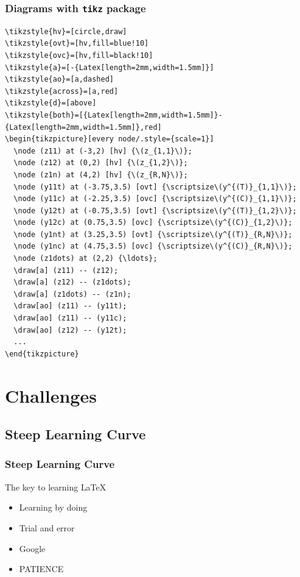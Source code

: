 \documentclass{beamer} %
\begin{document}
\begin{frame}[fragile]
\frametitle{Diagrams with \texttt{tikz} package}
\begin{Verbatim}[fontsize=\tiny]
\tikzstyle{hv}=[circle,draw]
\tikzstyle{ovt}=[hv,fill=blue!10]
\tikzstyle{ovc}=[hv,fill=black!10]
\tikzstyle{a}=[-{Latex[length=2mm,width=1.5mm]}]
\tikzstyle{ao}=[a,dashed]
\tikzstyle{across}=[a,red]
\tikzstyle{d}=[above]
\tikzstyle{both}=[{Latex[length=2mm,width=1.5mm]}-{Latex[length=2mm,width=1.5mm]},red]
\begin{tikzpicture}[every node/.style={scale=1}]
  \node (z11) at (-3,2) [hv] {\(z_{1,1}\)};
  \node (z12) at (0,2) [hv] {\(z_{1,2}\)};
  \node (z1n) at (4,2) [hv] {\(z_{R,N}\)};
  \node (y11t) at (-3.75,3.5) [ovt] {\scriptsize\(y^{(T)}_{1,1}\)};
  \node (y11c) at (-2.25,3.5) [ovc] {\scriptsize\(y^{(C)}_{1,1}\)};
  \node (y12t) at (-0.75,3.5) [ovt] {\scriptsize\(y^{(T)}_{1,2}\)};
  \node (y12c) at (0.75,3.5) [ovc] {\scriptsize\(y^{(C)}_{1,2}\)};
  \node (y1nt) at (3.25,3.5) [ovt] {\scriptsize\(y^{(T)}_{R,N}\)};
  \node (y1nc) at (4.75,3.5) [ovc] {\scriptsize\(y^{(C)}_{R,N}\)};
  \node (z1dots) at (2,2) {\ldots};
  \draw[a] (z11) -- (z12);
  \draw[a] (z12) -- (z1dots);
  \draw[a] (z1dots) -- (z1n);
  \draw[ao] (z11) -- (y11t);
  \draw[ao] (z11) -- (y11c);
  \draw[ao] (z12) -- (y12t);
  ...
\end{tikzpicture}
\end{Verbatim}
\end{frame}
 
 \section{Challenges}\label{challenge}
 
 \subsection{Steep Learning Curve}
 
\begin{frame}
\frametitle{Steep Learning Curve}
\begin{block}{The key to learning {\LaTeX}}
\begin{itemize}
\item Learning by doing
\item Trial and error
\item Google
\item \textsc{PATIENCE}
\end{itemize}
 \end{block}
\end{frame}
 
\end{document}
